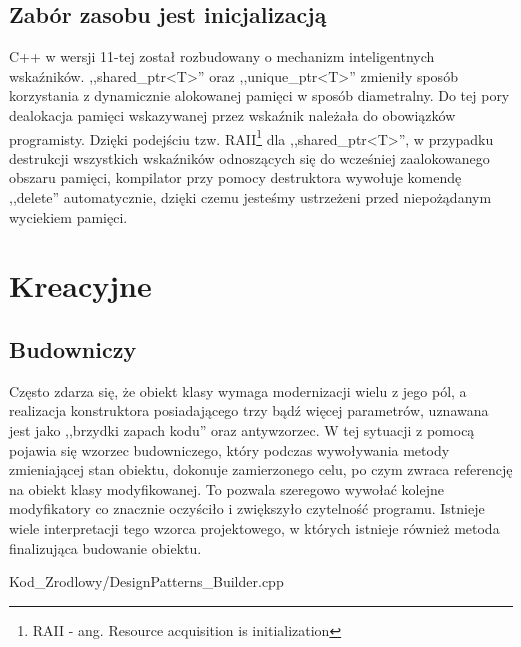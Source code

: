    \subsection{Zabór zasobu jest inicjalizacją}
        C++ w wersji 11-tej został rozbudowany o mechanizm inteligentnych wskaźników. ,,shared\_ptr<T>'' oraz ,,unique\_ptr<T>'' zmieniły sposób korzystania z
        dynamicznie alokowanej pamięci w sposób diametralny. Do tej pory dealokacja pamięci wskazywanej przez wskaźnik należała do obowiązków programisty.
        Dzięki podejściu tzw. RAII\footnote{\label{RAII} RAII - ang. Resource acquisition is initialization} dla ,,shared\_ptr<T>'', w przypadku destrukcji wszystkich wskaźników odnoszących się do wcześniej zaalokowanego obszaru pamięci,
        kompilator przy pomocy destruktora wywołuje komendę ,,delete'' automatycznie, dzięki czemu jesteśmy ustrzeżeni przed niepożądanym wyciekiem pamięci.

\section{Kreacyjne}
    \subsection{Budowniczy}
        Często zdarza się, że obiekt klasy wymaga modernizacji wielu z jego pól, a realizacja konstruktora posiadającego trzy bądź więcej parametrów,
        uznawana jest jako ,,brzydki zapach kodu'' oraz antywzorzec. W tej sytuacji z pomocą pojawia się wzorzec budowniczego, który podczas wywoływania metody 
        zmieniającej stan obiektu, dokonuje zamierzonego celu, po czym zwraca referencję na obiekt klasy modyfikowanej. 
        To pozwala szeregowo wywołać kolejne modyfikatory co znacznie oczyściło i zwiększyło czytelność programu. Istnieje wiele interpretacji tego wzorca projektowego,
        w których istnieje również metoda finalizująca budowanie obiektu.
        
            {Kod_Zrodlowy/DesignPatterns_Builder.cpp}
